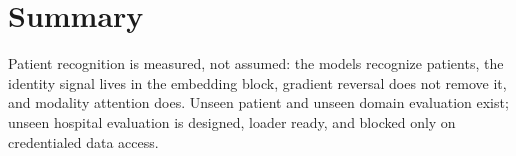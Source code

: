 \documentclass[11pt]{article}
\begin{document}
\section{Summary}
Patient recognition is measured, not assumed: the models recognize patients,
the identity signal lives in the embedding block, gradient reversal does not
remove it, and modality attention does. Unseen patient and unseen domain
evaluation exist; unseen hospital evaluation is designed, loader ready, and
blocked only on credentialed data access.
\end{document}
